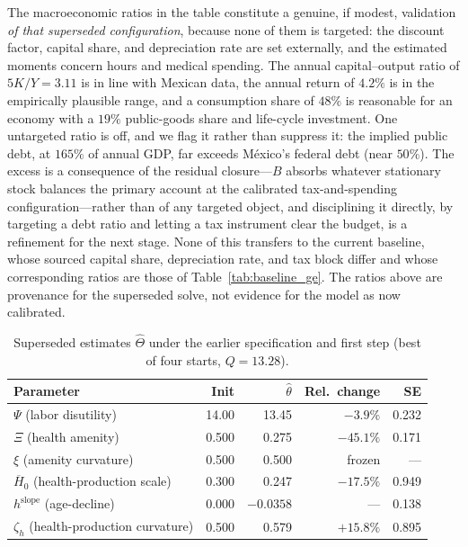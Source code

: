 \documentclass[12pt,a4paper]{article}
\begin{document}
\begin{appendices}
The macroeconomic ratios in the table constitute a genuine, if modest, validation \emph{of that superseded configuration}, because none of them is targeted: the discount factor, capital share, and depreciation rate are set externally, and the estimated moments concern hours and medical spending. The annual capital--output ratio of $5K/Y=3.11$ is in line with Mexican data, the annual return of $4.2\%$ is in the empirically plausible range, and a consumption share of $48\%$ is reasonable for an economy with a $19\%$ public-goods share and life-cycle investment. One untargeted ratio is off, and we flag it rather than suppress it: the implied public debt, at $165\%$ of annual GDP, far exceeds M\'exico's federal debt (near $50\%$). The excess is a consequence of the residual closure---$B$ absorbs whatever stationary stock balances the primary account at the calibrated tax-and-spending configuration---rather than of any targeted object, and disciplining it directly, by targeting a debt ratio and letting a tax instrument clear the budget, is a refinement for the next stage. None of this transfers to the current baseline, whose sourced capital share, depreciation rate, and tax block differ and whose corresponding ratios are those of Table~\ref{tab:baseline_ge}. The ratios above are provenance for the superseded solve, not evidence for the model as now calibrated.

\begin{table}[H]
\centering
\caption{Superseded estimates $\widehat\Theta$ under the earlier specification and first step (best of four starts, $Q=13.28$).}
\label{tab:theta_hat}
\begin{tabular}{lrrrr}
\toprule
Parameter & Init & $\widehat\theta$ & Rel.\ change & SE \\
\midrule
$\Psi$ (labor disutility)                  & 14.00  & 13.45    & $-3.9\%$  & 0.232 \\
$\Xi$ (health amenity)                     & 0.500  & 0.275    & $-45.1\%$ & 0.171 \\
$\xi$ (amenity curvature)                  & 0.500  & 0.500    & frozen    & ---   \\
$\overline{H}_0$ (health-production scale) & 0.300  & 0.247    & $-17.5\%$ & 0.949 \\
$h^{\mathrm{slope}}$ (age-decline)         & 0.000  & $-0.0358$ & ---      & 0.138 \\
$\zeta_h$ (health-production curvature)    & 0.500  & 0.579    & $+15.8\%$ & 0.895 \\
\bottomrule
\end{tabular}


\end{table}
\end{appendices}
\end{document}
